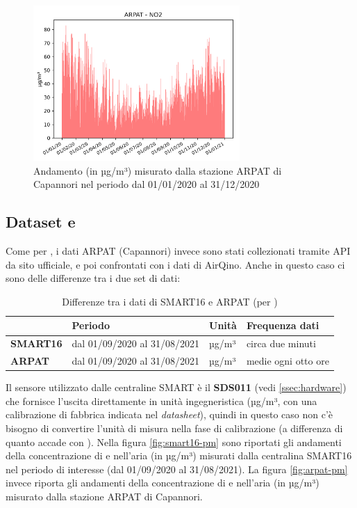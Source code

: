 \begin{figure}[H]
\centering
\captionsetup{justification=centering}
\includegraphics[width=0.70\textwidth,height=\textheight,keepaspectratio]{img/lu-capannori_no2_2020_cleaned_no2.png}
\caption{Andamento  (in µg/m³) misurato dalla stazione ARPAT di Capannori nel periodo dal 01/01/2020 al 31/12/2020}
\label{fig:arpat-no2}
\end{figure}

\subsection{Dataset  e }\label{ssec:dataset-pm}
Come per , i dati ARPAT (Capannori) invece sono stati collezionati tramite API da sito ufficiale, e poi confrontati con i dati di AirQino.
Anche in questo caso ci sono delle differenze tra i due set di dati:

\begin{table}[H]
\centering
\def\arraystretch{0.9}
\begin{tabular}{|l|l|l|l|}
\cline{2-4}
\multicolumn{1}{c|}{} & \textbf{Periodo} & \textbf{Unità} & \textbf{Frequenza dati} \\ \hline
\textbf{SMART16} & dal 01/09/2020 al 31/08/2021 & µg/m³ & circa due minuti \\ \hline
\textbf{ARPAT} & dal 01/09/2020 al 31/08/2021 & µg/m³ & medie ogni otto ore \\ \hline
\end{tabular}
\captionsetup{justification=centering}
\caption{Differenze tra i dati di SMART16 e ARPAT (per )}
\label{tab:dataset-no2-tabella}
\end{table}

Il sensore utilizzato dalle centraline SMART è il \textbf{SDS011} (vedi \ref{ssec:hardware}) che fornisce l'uscita direttamente in unità ingegneristica (µg/m³, con una calibrazione di fabbrica indicata nel \textit{datasheet}), quindi in questo caso non c'è bisogno di convertire l'unità di misura nella fase di calibrazione (a differenza di quanto accade con ).
Nella figura \ref{fig:smart16-pm} sono riportati gli andamenti della concentrazione di  e  nell'aria (in µg/m³) misurati dalla centralina SMART16 nel periodo di interesse (dal 01/09/2020 al 31/08/2021).
La figura \ref{fig:arpat-pm} invece riporta gli andamenti della concentrazione di  e  nell'aria (in µg/m³) misurato dalla stazione ARPAT di Capannori.


